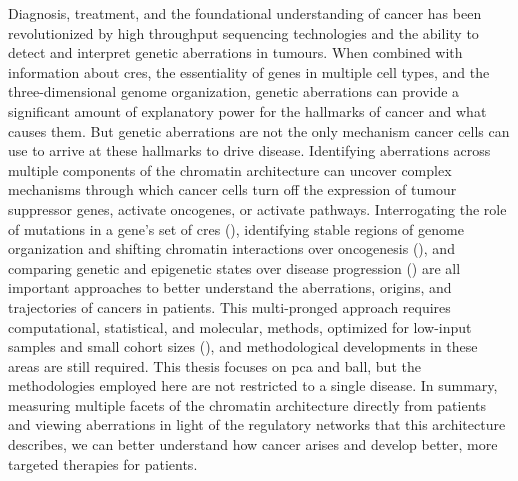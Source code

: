 Diagnosis, treatment, and the foundational understanding of cancer has been revolutionized by high throughput sequencing technologies and the ability to detect and interpret genetic aberrations in tumours.
When combined with information about \glspl{cre}, the essentiality of genes in multiple cell types, and the three-dimensional genome organization, genetic aberrations can provide a significant amount of explanatory power for the hallmarks of cancer and what causes them.
But genetic aberrations are not the only mechanism cancer cells can use to arrive at these hallmarks to drive disease.
Identifying aberrations across multiple components of the chromatin architecture can uncover complex mechanisms through which cancer cells turn off the expression of tumour suppressor genes, activate oncogenes, or activate pathways.
Interrogating the role of mutations in a gene's set of \glspl{cre} (), identifying stable regions of genome organization and shifting chromatin interactions over oncogenesis (), and comparing genetic and epigenetic states over disease progression () are all important approaches to better understand the aberrations, origins, and trajectories of cancers in patients.
This multi-pronged approach requires computational, statistical, and molecular, methods, optimized for low-input samples and small cohort sizes (), and methodological developments in these areas are still required.
This thesis focuses on \gls{pca} and \gls{ball}, but the methodologies employed here are not restricted to a single disease.
In summary, measuring multiple facets of the chromatin architecture directly from patients and viewing aberrations in light of the regulatory networks that this architecture describes, we can better understand how cancer arises and develop better, more targeted therapies for patients.
